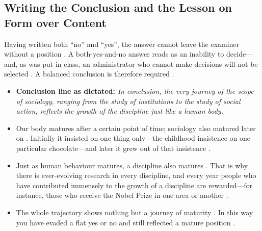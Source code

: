 \subsection{Writing the Conclusion and the Lesson on Form over Content}
Having written both ``no'' and ``yes'', the answer cannot leave the examiner without a position . A both-yes-and-no answer reads as an inability to decide---and, as was put in class, an administrator who cannot make decisions will not be selected . A balanced conclusion is therefore required .

\begin{KeyConcept}
\begin{itemize}
    \item \textbf{Conclusion line as dictated:} \textit{In conclusion, the very journey of the scope of sociology, ranging from the study of institutions to the study of social action, reflects the growth of the discipline just like a human body.} 
    \item Our body matures after a certain point of time; sociology also matured later on . Initially it insisted on one thing only---the childhood insistence on one particular chocolate---and later it grew out of that insistence .
    \item Just as human behaviour matures, a discipline also matures . That is why there is ever-evolving research in every discipline, and every year people who have contributed immensely to the growth of a discipline are rewarded---for instance, those who receive the Nobel Prize in one area or another .
    \item The whole trajectory shows nothing but a journey of maturity . In this way you have evaded a flat yes or no and still reflected a mature position .
\end{itemize}
\end{KeyConcept}

